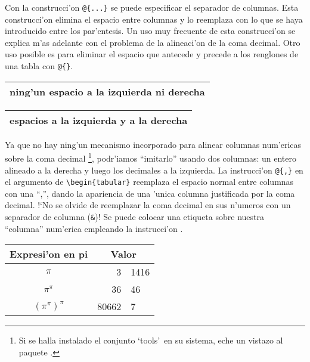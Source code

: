 Con la construcci'on \verb|@{...}| se puede especificar el separador
de columnas. Esta construcci'on elimina el espacio entre columnas y lo
reemplaza con lo que se haya introducido entre los par'entesis. Un uso
muy frecuente de esta construcci'on se explica m'as adelante con el
problema de la alineaci'on de la coma decimal. Otro uso posible es
para eliminar el espacio que antecede y precede a los renglones de una
tabla con \verb|@{}|.

\begin{example}
\begin{tabular}{@{} l @{}}
\hline
ning'un espacio a la izquierda
ni derecha\\\hline
\end{tabular}
\end{example}
\begin{example}
\begin{tabular}{l}
\hline
espacios a la izquierda
y a la derecha\\
\hline
\end{tabular}
\end{example}

 Ya que no hay ning'un mecanismo
incorporado para alinear columnas num'ericas sobre la coma decimal
\footnote{Si se halla instalado el conjunto `tools'\ en su sistema,
  eche un vistazo al paquete .}, podr'iamos ``imitarlo''
usando dos columnas: un entero alineado a la derecha y luego los
decimales a la izquierda. La instrucci'on \verb|@{,}| en el argumento
de \verb|\begin{tabular}| reemplaza el espacio normal entre columnas
  con una ``,'', dando la apariencia de una 'unica columna justificada
  por la coma decimal. !`No se olvide de reemplazar la coma decimal en
  sus n'umeros con un separador de columna (\verb|&|)! Se puede
  colocar una etiqueta sobre nuestra ``columna'' num'erica empleando
  la instrucci'on .

\begin{example}
\begin{tabular}{c r @{,} l}
Expresi'on en pi       &
\multicolumn{2}{c}{Valor} \\
\hline
$\pi$               & 3&1416  \\
$\pi^{\pi}$         & 36&46   \\
$(\pi^{\pi})^{\pi}$ & 80662&7 \\
\end{tabular}
\end{example}

